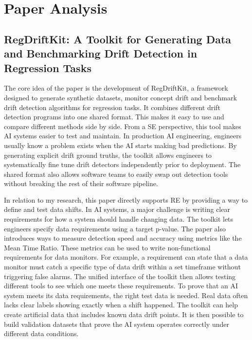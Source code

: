 \section{Paper Analysis}
\subsection{RegDriftKit: A Toolkit for Generating Data and Benchmarking Drift Detection in Regression Tasks~\cite{kilic2026regdriftkit}}

The core idea of the paper is the development of RegDriftKit, a framework designed to generate synthetic datasets, monitor concept drift and benchmark drift detection algorithms for regression tasks. It combines different drift detection programs into one shared format. This makes it easy to use and compare different methods side by side. From a SE perspective, this tool makes AI systems easier to test and maintain. In production AI engineering, engineers usually know a problem exists when the AI starts making bad predictions. By generating explicit drift ground truths, the toolkit allows engineers to systematically fine tune drift detectors independently prior to deployment. The shared format also allows software teams to easily swap out detection tools without breaking the rest of their software pipeline.

In relation to my research, this paper directly supports RE by providing a way to define and test data shifts. In AI systems, a major challenge is writing clear requirements for how a system should handle changing data. The toolkit lets engineers specify data requirements using a target p-value. The paper also introduces ways to measure detection speed and accuracy using metrics like the Mean Time Ratio. These metrics can be used to write non-functional requirements for data monitors. For example, a requirement can state that a data monitor must catch a specific type of data drift within a set timeframe without triggering false alarms. The unified interface of the toolkit then allows testing different tools to see which one meets these requirements. To prove that an AI system meets its data requirements, the right test data is needed. Real data often lacks clear labels showing exactly when a shift happened. The toolkit can help create artificial data that includes known data drift points. It is then possible to build validation datasets that prove the AI system operates correctly under different data conditions.

